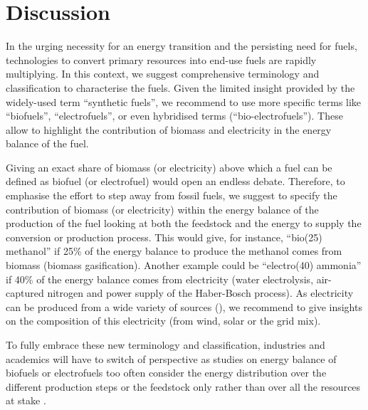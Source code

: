 \section{Discussion}
\label{sec:discussion}
In the urging necessity for an energy transition and the persisting need for fuels, technologies to convert primary resources into end-use fuels are rapidly multiplying. In this context, we suggest comprehensive terminology and classification to characterise the fuels. Given the limited insight provided by the widely-used term ``synthetic fuels'', we recommend to use more specific terms like ``biofuels'', ``electrofuels'', or even hybridised terms (\eg ``bio-electrofuels''). These allow to highlight the contribution of biomass and electricity in the energy balance of the fuel.

Giving an exact share of biomass (or electricity) above which a fuel can be defined as biofuel (or electrofuel) would open an endless debate. Therefore, to emphasise the effort to step away from fossil fuels, we suggest to specify the contribution of biomass (or electricity) within the energy balance of the production of the fuel looking at both the feedstock and the energy to supply the conversion or production process. This would give, for instance, ``bio(25) methanol'' if 25\% of the energy balance to produce the methanol comes from biomass (\eg biomass gasification). Another example could be ``electro(40) ammonia'' if 40\% of the energy balance comes from electricity (\eg water electrolysis, air-captured nitrogen and power supply of the Haber-Bosch process). As electricity can be produced from a wide variety of sources (), we recommend to give insights on the composition of this electricity (\eg from wind, solar or the grid mix). 

To fully embrace these new terminology and classification, industries and academics will have to switch of perspective as studies on energy balance of biofuels or electrofuels too often consider the energy distribution over the different production steps or the feedstock only rather than over all the resources at stake \cite{OConnell2019,slade2013micro}.




